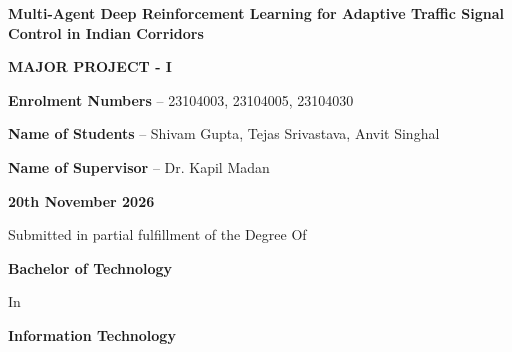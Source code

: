 \documentclass[12pt,a4paper,oneside]{report}
\begin{document}
\thispagestyle{empty}

\begin{center}
    \vspace*{0.3cm}
    {\fontsize{18}{22}\bfseries Multi-Agent Deep Reinforcement Learning for Adaptive Traffic Signal Control in Indian Corridors\par}
    
    \vspace{1.2cm}
    {\fontsize{14}{18}\bfseries MAJOR PROJECT - I\par}
    
    \vspace{1.2cm}
    {\fontsize{12}{16}\selectfont\textbf{Enrolment Numbers} -- 23104003, 23104005, 23104030\par}
    \vspace{0.4cm}
    {\fontsize{12}{16}\selectfont\textbf{Name of Students} -- Shivam Gupta, Tejas Srivastava, Anvit Singhal\par}
    
    \vspace{1.0cm}
    {\fontsize{12}{16}\selectfont\textbf{Name of Supervisor} -- Dr. Kapil Madan\par}
    
    \vfill
    \begin{figure}[h]
        \centering
    \end{figure}
    \vspace{0.2cm}
    
    {\fontsize{12}{15}\selectfont\textbf{20th November 2026}\par}
    \vspace{0.5cm}
    {\fontsize{12}{15}\selectfont Submitted in partial fulfillment of the Degree Of\par}
    \vspace{0.2cm}
    {\fontsize{14}{17}\bfseries Bachelor of Technology\par}
    {\fontsize{12}{15}\selectfont In\par}
    {\fontsize{13}{16}\bfseries Information Technology\par}
    

\end{center}
\end{document}
